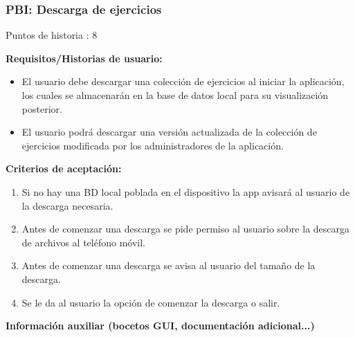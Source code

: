 \documentclass[11pt,a4paper]{report}
\begin{document}
\subsubsection{PBI: Descarga de ejercicios}
Puntos de historia : 8
\par\textbf{Requisitos/Historias de usuario:}
\begin{itemize}
	\item El usuario debe descargar una colección de ejercicios al iniciar la aplicación, los cuales se almacenarán en la base de datos local para su visualización posterior.
	\item El usuario podrá descargar una versión actualizada de la colección de ejercicios modificada por los administradores de la aplicación.
\end{itemize}
\par\textbf{Criterios de aceptación:}
\begin{enumerate}
	\item Si no hay una BD local poblada en el dispositivo la app avisará al usuario de la
	descarga necesaria.
	\item Antes de comenzar una descarga se pide permiso al usuario sobre la descarga de archivos al teléfono móvil.
	\item Antes de comenzar una descarga se avisa al usuario del tamaño de la descarga.
	\item Se le da al usuario la opción de comenzar la descarga o salir.
\end{enumerate}
\par\textbf{Información auxiliar (bocetos GUI, documentación adicional...)}
\end{document}
